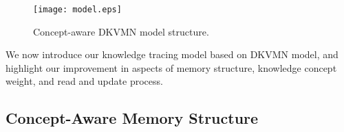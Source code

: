 \documentclass{edm_template}
\begin{document}






\begin{figure}
\texttt{[image: model.eps]}
\caption{Concept-aware DKVMN model structure. }
\label{model}
\end{figure}

We now introduce our knowledge tracing model based on DKVMN model, and highlight our improvement in aspects of memory structure, knowledge concept weight, and read and update process.

\subsection{Concept-Aware Memory Structure}
\end{document}
